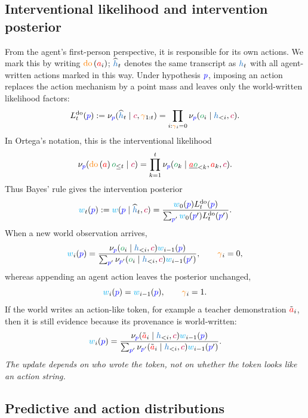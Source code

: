 \documentclass[11pt]{article}
\newcommand{\action}{\ensuremath{\textcolor{red}{a}}}
\newcommand{\obs}{\ensuremath{\textcolor{ForestGreen}{o}}}
\newcommand{\program}{\ensuremath{\textcolor{blue}{p}}}
\newcommand{\contextsym}{\ensuremath{\textcolor{purple}{c}}}
\newcommand{\gate}{\ensuremath{\textcolor{orange}{\gamma}}}
\newcommand{\weight}{\ensuremath{\textcolor{cyan}{w}}}
\newcommand{\history}{\ensuremath{\textcolor{RoyalBlue}{h}}}
\newcommand{\kernel}{\ensuremath{\nu}}
\newcommand{\lik}{\ensuremath{L}}
\newcommand{\dolik}{\ensuremath{\lik^{\mathrm{do}}}}
\newcommand{\thirdaction}{\ensuremath{\tilde{\action}}}
\newcommand{\dohistory}{\ensuremath{\widehat{\history}}}
\newcommand{\pairhistory}{\ensuremath{\underline{\action\obs}}}
\newcommand{\doop}{\operatorname{\textcolor{orange}{do}}}
\newcommand{\intervene}[1]{\ensuremath{\doop \left(#1\right)}}
\begin{document}
\subsection{Interventional likelihood and intervention posterior}

From the agent's first-person perspective, it is responsible for its own actions. We mark
this by writing $\intervene{\action_i}$; $\dohistory_t$ denotes the same
transcript as $\history_t$ with all agent-written actions marked in this way. Under
hypothesis $\program$, imposing an action replaces the action mechanism by a point mass
and leaves only the world-written likelihood factors:
\[
  \dolik_t(\program)
  :=
  \kernel_{\program}(\dohistory_t\mid \contextsym,\gate_{1:t})
  =
  \prod_{i:\gate_i=0}\kernel_{\program}(\obs_i\mid \history_{<i},\contextsym).
\]
In Ortega's notation, this is the interventional likelihood
\[
  \kernel_{\program}(\intervene{\action} \obs_{\le t}\mid \contextsym)
  =
  \prod_{k=1}^{t}\kernel_{\program}(\obs_k\mid \pairhistory_{<k},\action_k,\contextsym).
\]
Thus Bayes' rule gives the intervention posterior
\[
  \weight_t(\program)
  :=
  \weight(\program\mid \dohistory_t,\contextsym)
  =
  \frac{\weight_0(\program)\dolik_t(\program)}
       {\sum_{\program'} \weight_0(\program')\dolik_t(\program')}.
\]
When a new world observation arrives,
\[
  \weight_i(\program)
  =
  \frac{\kernel_{\program}(\obs_i\mid \history_{<i},\contextsym)\weight_{i-1}(\program)}
       {\sum_{\program'}\kernel_{\program'}(\obs_i\mid \history_{<i},\contextsym)\weight_{i-1}(\program')},
  \qquad \gate_i=0,
\]
whereas appending an agent action leaves the posterior unchanged,
\[
  \weight_i(\program)=\weight_{i-1}(\program),
  \qquad \gate_i=1.
\]
If the world writes an action-like token, for example a teacher demonstration
$\thirdaction_i$, then it is still evidence because its provenance is world-written:
\[
  \weight_i(\program)
  =
  \frac{\kernel_{\program}(\thirdaction_i\mid \history_{<i},\contextsym)\weight_{i-1}(\program)}
       {\sum_{\program'}\kernel_{\program'}(\thirdaction_i\mid \history_{<i},\contextsym)\weight_{i-1}(\program')}.
\]
\emph{The update depends on who wrote the token, not on whether the token looks like
an action string.}







\subsection{Predictive and action distributions}
\end{document}
